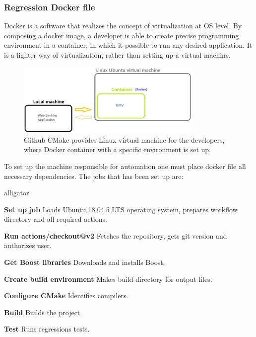\documentclass[a4paper,12pt]{book}
\newcommand\tab[1][1cm]{\hspace*{#1}}
\begin{document}
\subsubsection{Regression Docker file}
{
\tab Docker is a software that realizes the concept of virtualization at OS level. By composing a docker image, a developer is able to create precise programming environment in a container, in which it possible to run any desired application. It is a lighter way of virtualization, rather than setting up a virtual machine.      

\begin{figure}[H]
  \centering
    \includegraphics[width=0.8\textwidth]{scheme}
    \caption{Github CMake provides Linux virtual machine for the developers, where Docker container with a specific environment is set up.}
\end{figure} 
    
\bigskip 
To set up the machine responsible for automation one must place docker file all necessary dependencies. The jobs that has been set up are: 
    
\begin{labeling}{alligator}
\item [\textbf{Set up job}] Loads Ubuntu 18.04.5 LTS operating system, prepares workflow directory and all required actions.

\item [\textbf{Run actions/checkout@v2}] Fetches the repository, gets git version and authorizes user.

\item [\textbf{Get Boost libraries}] Downloads and installs Boost.

\item [\textbf{Create build environment}] Makes build directory for output files.

\item [\textbf{Configure CMake}] Identifies compilers.

\item [\textbf{Build}] Builds the project.

\item [\textbf{Test}] Runs regressions tests.


\end{labeling}}
\end{document}
